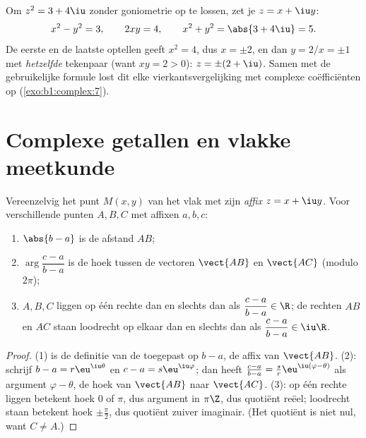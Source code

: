 \begin{example}\label{ex:b1:complex:sqrt}
Om $z^2 = 3 + 4\iu$ zonder goniometrie op te lossen, zet je $z = x + \iu
y$:
\[
x^2 - y^2 = 3, \qquad 2xy = 4, \qquad x^2 + y^2 = \abs{3 + 4\iu} = 5 .
\]
De eerste en de laatste optellen geeft $x^2 = 4$, dus $x = \pm 2$, en dan
$y = 2/x = \pm 1$ met \emph{hetzelfde} tekenpaar (want $xy = 2 > 0$): $z
= \pm(2 + \iu)$. Samen met de gebruikelijke formule lost dit elke
vierkantsvergelijking met complexe coëfficiënten op
(\cref{exo:b1:complex:7}).
\end{example}

\section{Complexe getallen en vlakke meetkunde}

\begin{proposition}\label{prop:b1:complex:geometry}
Vereenzelvig het punt $M(x, y)$ van het vlak met zijn \emph{affix} $z = x
+ \iu y$. Voor verschillende punten $A, B, C$ met affixen
$a, b, c$:
\begin{enumerate}
  \item $\abs{b - a}$ is de afstand $AB$;
  \item $\arg\dfrac{c - a}{b - a}$ is de hoek tussen de vectoren
        $\vect{AB}$ en $\vect{AC}$ (modulo $2\pi$);
  \item $A, B, C$ liggen op één rechte dan en slechts dan als
        $\dfrac{c - a}{b - a} \in \R$; de rechten $AB$ en $AC$ staan
        loodrecht op elkaar dan en slechts dan als $\dfrac{c - a}{b -
        a} \in \iu\R$.
\end{enumerate}
\end{proposition}

\begin{proof}
(1) is de definitie van de  toegepast op $b - a$, de affix van
$\vect{AB}$. (2): schrijf $b - a = r\eu^{\iu\theta}$ en $c - a =
s\eu^{\iu\varphi}$; dan heeft $\frac{c-a}{b-a} = \frac sr \eu^{\iu(\varphi
- \theta)}$ als argument $\varphi - \theta$, de hoek van $\vect{AB}$ naar
$\vect{AC}$. (3): op één rechte liggen betekent hoek $0$ of $\pi$, dus
argument in $\pi\Z$, dus quotiënt reëel; loodrecht staan betekent hoek
$\pm\frac\pi2$, dus quotiënt zuiver imaginair. (Het quotiënt is niet nul,
want $C \neq A$.)
\end{proof}


